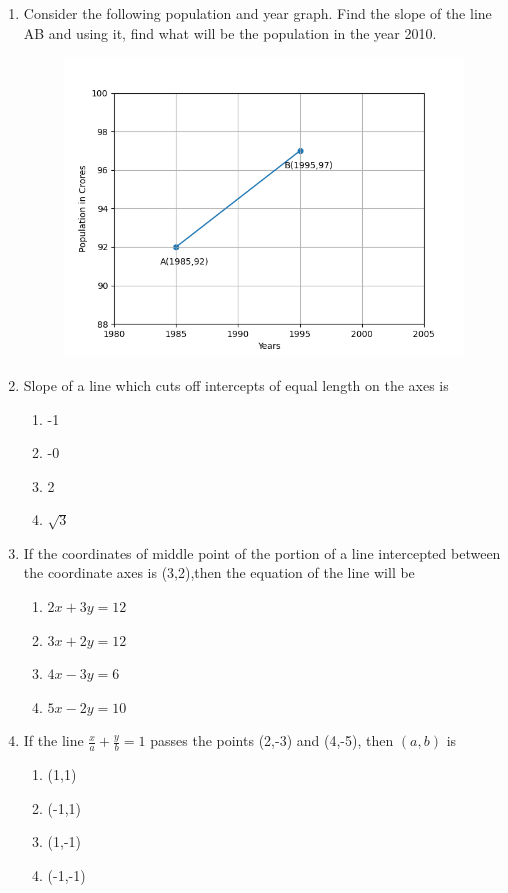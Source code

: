 \begin{enumerate}[label=\thesubsection.\arabic*,ref=\thesubsection.\theenumi]
\item Consider the following population and year graph. Find the slope of the line AB and using it, find what will be the population in the year 2010.
\\
\begin{figure}[H]
\centering
\includegraphics[width=0.75\columnwidth]{chapters/11/10/1/14/figs/fig.png}
\caption{}
\label{fig:chapters/11/10/1/14/1}
\end{figure}
\solution

\item Slope of a line which cuts off intercepts of equal length on the axes is 
\begin{enumerate}
\item -1
\item -0
\item 2
\item $\sqrt{3}$
\end{enumerate}
\item If the coordinates of middle point of the portion of a line intercepted between the coordinate axes is (3,2),then the equation of the line will be
\begin{enumerate}
\item $2x+3y=12$
\item $3x+2y=12$
\item $4x-3y=6$
\item $5x-2y=10$
\end{enumerate}
\item If the line $\frac{x}{a}+\frac{y}{b}=1$ passes the points (2,-3) and (4,-5), then $(a,b)$ is 
\begin{enumerate}
\item (1,1)
\item (-1,1)
\item (1,-1)
\item (-1,-1)

\end{enumerate}
\end{enumerate}
